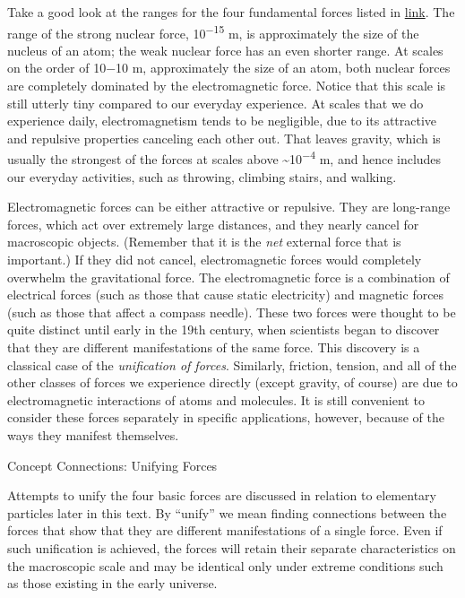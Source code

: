 \documentclass[
]{book}
\newenvironment{note}{}{}
\begin{document}
Take a good look at the ranges for the four fundamental forces listed in
\protect\hyperlink{import-auto-id1588108}{link}. The range of the
strong nuclear force, 10\textsuperscript{−15} m, is approximately the size of the
nucleus of an atom; the weak nuclear force has an even shorter range. At
scales on the order of 10−10 m, approximately the size of an atom, both
nuclear forces are completely dominated by the electromagnetic force.
Notice that this scale is still utterly tiny compared to our everyday
experience. At scales that we do experience daily, electromagnetism
tends to be negligible, due to its attractive and repulsive properties
canceling each other out. That leaves gravity, which is usually the
strongest of the forces at scales above \textasciitilde10\textsuperscript{−4} m, and hence includes
our everyday activities, such as throwing, climbing stairs, and walking.

Electromagnetic forces can be either attractive or repulsive. They are
long-range forces, which act over extremely large distances, and they
nearly cancel for macroscopic objects. (Remember that it is the \emph{net}
external force that is important.) If they did not cancel,
electromagnetic forces would completely overwhelm the gravitational
force. The electromagnetic force is a combination of electrical forces
(such as those that cause static electricity) and magnetic forces (such
as those that affect a compass needle). These two forces were thought to
be quite distinct until early in the 19th century, when scientists began
to discover that they are different manifestations of the same force.
This discovery is a classical case of the \emph{unification of forces}.
Similarly, friction, tension, and all of the other classes of forces we
experience directly (except gravity, of course) are due to
electromagnetic interactions of atoms and molecules. It is still
convenient to consider these forces separately in specific applications,
however, because of the ways they manifest themselves.

\hypertarget{fs-id2423408}{}
\begin{note}

Concept Connections: Unifying Forces

Attempts to unify the four basic forces are discussed in relation to
elementary particles later in this text. By ``unify'' we mean finding
connections between the forces that show that they are different
manifestations of a single force. Even if such unification is achieved,
the forces will retain their separate characteristics on the macroscopic
scale and may be identical only under extreme conditions such as those
existing in the early universe.

\end{note}
\end{document}
